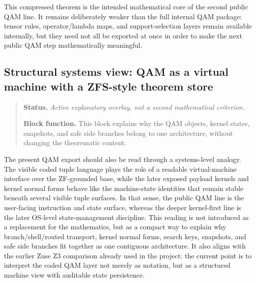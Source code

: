 \begin{remark}
This compressed theorem is the intended mathematical core of the second public QAM line. It remains deliberately weaker than the full internal QAM package: tensor rules, operator/lambda maps, and support-selection layers remain available internally, but they need not all be exported at once in order to make the next public QAM step mathematically meaningful.
\end{remark}

\subsection*{Structural systems view: QAM as a virtual machine with a ZFS-style theorem store}
\begin{quote}\small
\noindent\textbf{Status.} \emph{Active explanatory overlay, not a second mathematical criterion.}\par
\noindent\textbf{Block function.} This block explains why the QAM objects, kernel states, snapshots, and safe side branches belong to one architecture, without changing the theorematic content.
\end{quote}
The present QAM export should also be read through a systems-level analogy. The visible coded tuple language plays the role of a readable virtual-machine interface over the ZF-grounded base, while the later exposed payload kernels and kernel normal forms behave like the machine-state identities that remain stable beneath several visible tuple surfaces. In that sense, the public QAM line is the user-facing instruction and state surface, whereas the deeper kernel-first line is the later OS-level state-management discipline. This reading is not introduced as a replacement for the mathematics, but as a compact way to explain why branch/shell/routed transport, kernel normal forms, search keys, snapshots, and safe side branches fit together as one contiguous architecture. It also aligns with the earlier Zuse Z3 comparison already used in the project: the current point is to interpret the coded QAM layer not merely as notation, but as a structured machine view with auditable state persistence.

